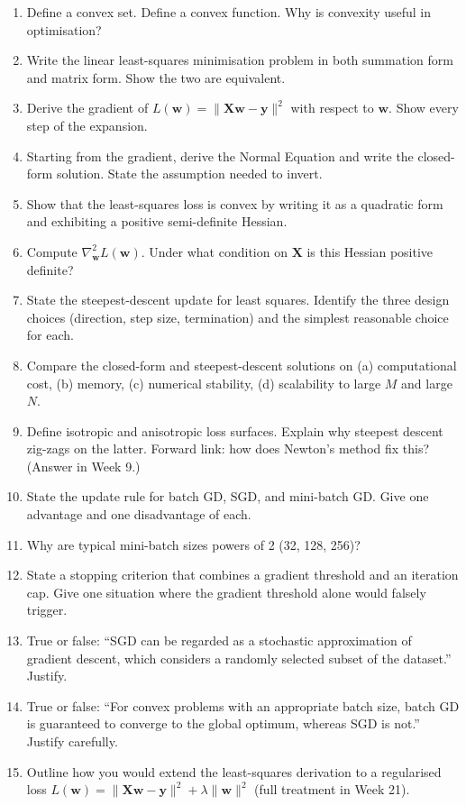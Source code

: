 \documentclass[11pt, a4paper]{article}
\begin{document}
\begin{enumerate}
  \item Define a convex set. Define a convex function. Why is convexity useful in optimisation?
  \item Write the linear least-squares minimisation problem in both summation form and matrix form. Show the two are equivalent.
  \item Derive the gradient of $L(\mathbf{w}) = \|\mathbf{X}\mathbf{w}-\mathbf{y}\|^2$ with respect to $\mathbf{w}$. Show every step of the expansion.
  \item Starting from the gradient, derive the Normal Equation and write the closed-form solution. State the assumption needed to invert.
  \item Show that the least-squares loss is convex by writing it as a quadratic form and exhibiting a positive semi-definite Hessian.
  \item Compute $\nabla^2_\mathbf{w} L(\mathbf{w})$. Under what condition on $\mathbf{X}$ is this Hessian positive definite?
  \item State the steepest-descent update for least squares. Identify the three design choices (direction, step size, termination) and the simplest reasonable choice for each.
  \item Compare the closed-form and steepest-descent solutions on (a) computational cost, (b) memory, (c) numerical stability, (d) scalability to large $M$ and large $N$.
  \item Define isotropic and anisotropic loss surfaces. Explain why steepest descent zig-zags on the latter. Forward link: how does Newton's method fix this? (Answer in Week 9.)
  \item State the update rule for batch GD, SGD, and mini-batch GD. Give one advantage and one disadvantage of each.
  \item Why are typical mini-batch sizes powers of 2 (32, 128, 256)?
  \item State a stopping criterion that combines a gradient threshold and an iteration cap. Give one situation where the gradient threshold alone would falsely trigger.
  \item True or false: ``SGD can be regarded as a stochastic approximation of gradient descent, which considers a randomly selected subset of the dataset.'' Justify.
  \item True or false: ``For convex problems with an appropriate batch size, batch GD is guaranteed to converge to the global optimum, whereas SGD is not.'' Justify carefully.
  \item Outline how you would extend the least-squares derivation to a regularised loss $L(\mathbf{w}) = \|\mathbf{X}\mathbf{w}-\mathbf{y}\|^2 + \lambda\|\mathbf{w}\|^2$ (full treatment in Week 21).
\end{enumerate}
\end{document}
